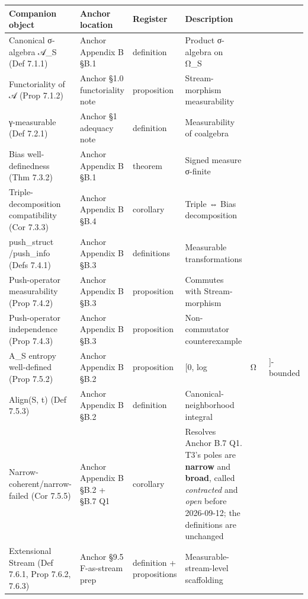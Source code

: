 \documentclass[11pt, openany]{book}
\begin{document}
\begingroup\setlength{\tabcolsep}{3pt}\renewcommand{\arraystretch}{1.15}\footnotesize
\begin{longtable}{p{0.59in} p{0.46in} p{0.46in} p{1.75in} p{0.46in} p{0.46in}}
\toprule
Companion object & Anchor location & Register & Description \\
\midrule
\endhead
\bottomrule
\endfoot
Canonical σ-algebra 𝒜\_\allowbreak{}S (Def 7.1.1) & Anchor Appendix B §B.1 & definition & Product σ-algebra on Ω\_\allowbreak{}S &  &  \\
\midrule
Functoriality of 𝒜 (Prop 7.1.2) & Anchor §1.0 functoriality note & proposition & Stream-morphism measurability &  &  \\
\midrule
γ-measurable (Def 7.2.1) & Anchor §1 adequacy note & definition & Measurability of coalgebra &  &  \\
\midrule
Bias well-definedness (Thm 7.3.2) & Anchor Appendix B §B.1 & theorem & Signed measure σ-finite &  &  \\
\midrule
Triple-decomposition compatibility (Cor 7.3.3) & Anchor Appendix B §B.4 & corollary & Triple ⇔ Bias decomposition &  &  \\
\midrule
push\_\allowbreak{}struct /\allowbreak  push\_\allowbreak{}info (Defs 7.4.1) & Anchor Appendix B §B.3 & definitions & Measurable transformations &  &  \\
\midrule
Push-operator measurability (Prop 7.4.2) & Anchor Appendix B §B.3 & proposition & Commutes with Stream-morphism &  &  \\
\midrule
Push-operator independence (Prop 7.4.3) & Anchor Appendix B §B.3 & proposition & Non-commutator counterexample &  &  \\
\midrule
A\_\allowbreak{}S entropy well-defined (Prop 7.5.2) & Anchor Appendix B §B.2 & proposition & [0, log\ & Ω\ & ]-bounded \\
\midrule
Align(S, t) (Def 7.5.3) & Anchor Appendix B §B.2 & definition & Canonical-neighborhood integral &  &  \\
\midrule
Narrow-coherent/\allowbreak narrow-failed (Cor 7.5.5) & Anchor Appendix B §B.2 + §B.7 Q1 & corollary & Resolves Anchor B.7 Q1. T3's poles are \textbf{narrow} and \textbf{broad}, called \textit{contracted} and \textit{open} before 2026-09-12; the definitions are unchanged &  &  \\
\midrule
Extensional Stream (Def 7.6.1, Prop 7.6.2, 7.6.3) & Anchor §9.5 F-as-stream prep & definition + propositions & Measurable-stream-level scaffolding &  &  \\
\bottomrule
\end{longtable}
\endgroup
\end{document}
